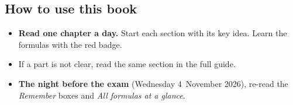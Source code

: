 \documentclass[11pt,a4paper,oneside,openany]{book}
\begin{document}
\subsection*{How to use this book}
\begin{itemize}[itemsep=1pt]
  \item \textbf{Read one chapter a day.} Start each section with its key idea. Learn the
        formulas with the red badge.
  \item If a part is not clear, read the same section in the full guide.
  \item \textbf{The night before the exam} (Wednesday 4~November 2026), re-read the
        \emph{Remember} boxes and \emph{All formulas at a glance}.
\end{itemize}

\tableofcontents


\end{document}
